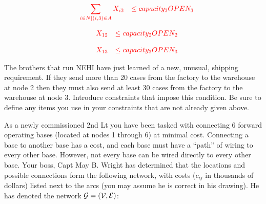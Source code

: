 \begin{parts}
\[
    \begin{array}{llll}
    & \displaystyle\textcolor{red}{\sum_{i \in N|(i,3) \in A} X_{i3}} & \textcolor{red}{\le capacity_3 OPEN_3} \\
    \end{array}
    \]

\[
    \begin{array}{llll}
    & \textcolor{red}{X_{12}} & \textcolor{red}{\le capacity_2 OPEN_2} \\
    \end{array}
    \]

\[
    \begin{array}{llll}
    & \textcolor{red}{X_{13}} & \textcolor{red}{\le capacity_3 OPEN_3} \\
    \end{array}
    \]

\vfill

 The brothers that run NEHI have just learned of a new, unusual, shipping requirement. If they send more than 20 cases from the factory to the warehouse at node 2 then they must also send at least 30 cases from the factory to the warehouse at node 3. Introduce constraints that impose this condition. Be sure to define any items you use in your constraints that are not already given above.

\vspace{0.25cm}


\vfill


\end{parts}
\newpage

As a newly commissioned 2nd Lt you have been tasked with connecting 6 forward operating bases (located at nodes 1 through 6) at minimal cost.  Connecting a base to another base has a cost, and each base must have a ``path'' of wiring to every other base. However, not every base can be wired directly to every other base.  Your boss, Capt May B. Wright has
determined that the locations and possible connections form the following network, with costs
($c_{ij}$ in thousands of dollars) listed next to the arcs (you may assume he is correct in his drawing). He has denoted the network ${\cal G} = ({\cal V}, {\cal E})$:


